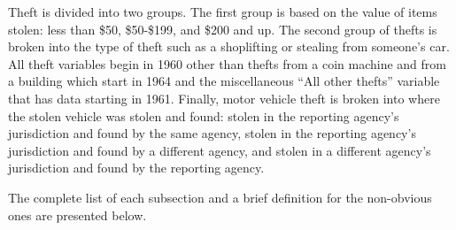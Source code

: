 \documentclass[
]{krantz}
\begin{document}
Theft is divided into two groups. The first group is based
on the value of items stolen: less than \$50, \$50-\$199,
and \$200 and up. The second group of thefts is broken into
the type of theft such as a shoplifting or stealing from
someone's car. All theft variables begin in 1960 other than
thefts from a coin machine and from a building which start
in 1964 and the miscellaneous ``All other thefts'' variable
that has data starting in 1961. Finally, motor vehicle theft
is broken into where the stolen vehicle was stolen and
found: stolen in the reporting agency's jurisdiction and
found by the same agency, stolen in the reporting agency's
jurisdiction and found by a different agency, and stolen in
a different agency's jurisdiction and found by the reporting
agency.

The complete list of each subsection and a brief definition
for the non-obvious ones are presented below.
\end{document}
